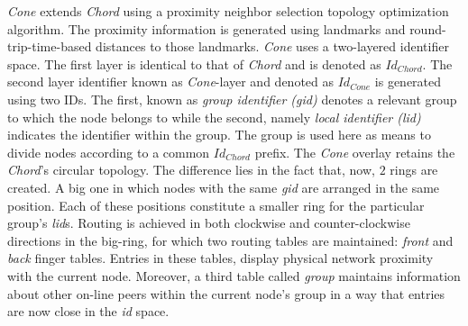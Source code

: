 \emph{Cone} \cite{HY2007} extends \emph{Chord} using a proximity neighbor
selection topology optimization algorithm. The proximity information is
generated using landmarks and round-trip-time-based distances to 
those landmarks. %
\emph{Cone} uses a two-layered identifier space. The first layer is 
identical to that of \emph{Chord} and is denoted as $Id_{Chord}$.
The second layer identifier known as \emph{Cone}-layer and denoted as 
$Id_{Cone}$ is generated using two IDs. 
The first, known as \emph{group identifier (gid)} denotes a
relevant group to which the node belongs to while the second, 
namely \emph{local identifier (lid)} indicates the %
identifier within the group. 
The group is used here as means to divide nodes according to  a
common $Id_{Chord}$ prefix.  
The \emph{Cone} overlay retains the \emph{Chord}'s circular topology. 
The difference lies in the fact that, now, $2$ rings are created. 
A big one in which nodes with the same \emph{gid} are arranged 
in the same position.
Each of these positions constitute a smaller ring for the particular
group's \emph{lid}s. 
Routing is achieved in both clockwise and
counter-clockwise directions in the big-ring, for which two routing tables are
maintained: \emph{front} and \emph{back} finger tables. 
Entries in these tables, display physical network proximity 
with the current node. 
Moreover, a third table called \emph{group} maintains 
information about other on-line peers
within the current node's group in a way that 
entries are now close in the \emph{id} space. %
%
